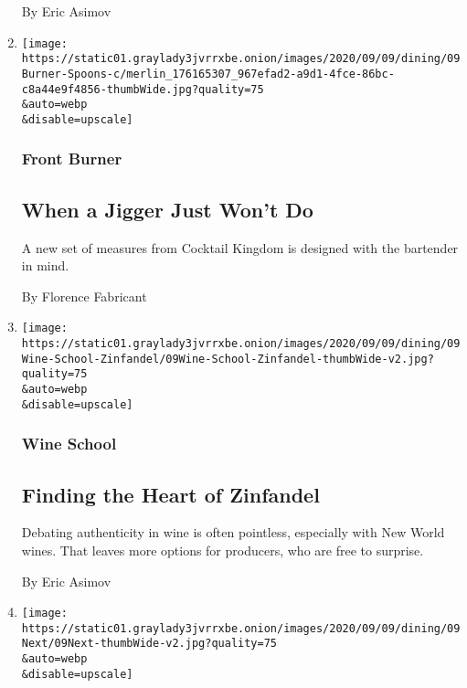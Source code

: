\begin{enumerate}
  By Eric Asimov
\item
  \href{/2020/09/07/dining/drinks/cocktail-measuring-spoons.html}{}

  \texttt{[image: https://static01.graylady3jvrrxbe.onion/images/2020/09/09/dining/09Burner-Spoons-c/merlin\_176165307\_967efad2-a9d1-4fce-86bc-c8a44e9f4856-thumbWide.jpg?quality=75\\\&auto=webp\\\&disable=upscale]}

  \hypertarget{front-burner}{%
  \subsubsection{Front Burner}\label{front-burner}}

  \hypertarget{when-a-jigger-just-wont-do}{%
  \subsection{When a Jigger Just Won't
  Do}\label{when-a-jigger-just-wont-do}}

  A new set of measures from Cocktail Kingdom is designed with the
  bartender in mind.

  By Florence Fabricant
\item
  \href{/2020/09/03/dining/drinks/wine-school-zinfandel.html}{}

  \texttt{[image: https://static01.graylady3jvrrxbe.onion/images/2020/09/09/dining/09Wine-School-Zinfandel/09Wine-School-Zinfandel-thumbWide-v2.jpg?quality=75\\\&auto=webp\\\&disable=upscale]}

  \hypertarget{wine-school-2}{%
  \subsubsection{Wine School}\label{wine-school-2}}

  \hypertarget{finding-the-heart-of-zinfandel}{%
  \subsection{Finding the Heart of
  Zinfandel}\label{finding-the-heart-of-zinfandel}}

  Debating authenticity in wine is often pointless, especially with New
  World wines. That leaves more options for producers, who are free to
  surprise.

  By Eric Asimov
\item
  \href{/2020/09/03/dining/drinks/wine-school-assignment-northern-rhone-reds.html}{}

  \texttt{[image: https://static01.graylady3jvrrxbe.onion/images/2020/09/09/dining/09Next/09Next-thumbWide-v2.jpg?quality=75\\\&auto=webp\\\&disable=upscale]}


\end{enumerate}
